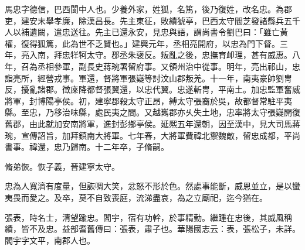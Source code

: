 
\begin{pinyinscope}
馬忠字德信，巴西閬中人也。少養外家，姓狐，名篤，後乃復姓，改名忠。為郡吏，建安末舉孝廉，除漢昌長。先主東征，敗績猇亭，巴西太守閻芝發諸縣兵五千人以補遺闕，遣忠送往。先主已還永安，見忠與語，謂尚書令劉巴曰：「雖亡黃權，復得狐篤，此為世不乏賢也。」建興元年，丞相亮開府，以忠為門下督。三年，亮入南，拜忠䍧牱太守。郡丞朱襃反。叛亂之後，忠撫育卹理，甚有威惠。八年，召為丞相參軍，副長史蔣琬署留府事。又領州治中從事。明年，亮出祁山，忠詣亮所，經營戎事。軍還，督將軍張嶷等討汶山郡叛羌。十一年，南夷豪帥劉冑反，擾亂諸郡。徵庲降都督張翼還，以忠代翼。忠遂斬冑，平南土。加忠監軍奮威將軍，封博陽亭侯。初，建寧郡殺太守正昂，縛太守張裔於吳，故都督常駐平夷縣。至忠，乃移治味縣，處民夷之間。又越嶲郡亦乆失土地，忠率將太守張嶷開復舊郡，由此就加安南將軍，進封彭鄉亭侯。延熈五年還朝，因至漢中，見大司馬蔣琬，宣傳詔旨，加拜鎮南大將軍。七年春，大將軍費禕北禦魏敵，留忠成都，平尚書事。禕還，忠乃歸南。十二年卒，子脩嗣。

脩弟恢。恢子義，晉建寧太守。

忠為人寬濟有度量，但詼啁大笑，忿怒不形於色。然處事能斷，威恩並立，是以蠻夷畏而愛之。及卒，莫不自致喪庭，流涕盡哀，為之立廟祀，迄今猶在。

張表，時名士，清望踰忠。閻宇，宿有功幹，於事精勤。繼踵在忠後，其威風稱績，皆不及忠。益部耆舊傳曰：張表，肅子也。華陽國志云：表，張松子，未詳。閻宇字文平，南郡人也。


\end{pinyinscope}